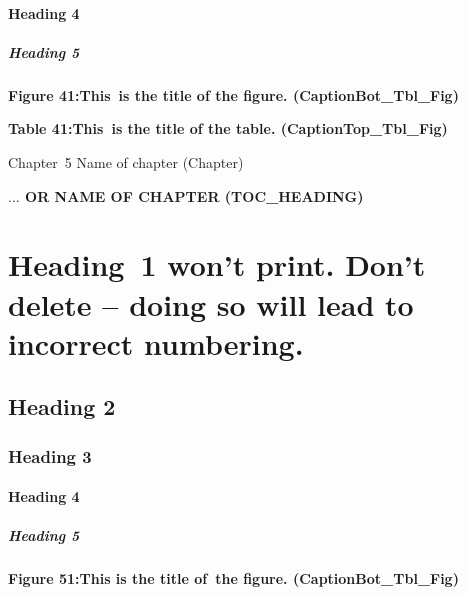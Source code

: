 \documentclass[12pt]{report}
\begin{document}
\paragraph*{Heading 4}
\subparagraph*{Heading 5}
\begin{FlushLeft}
\textbf{Figure 41:\tab This\ is the title of the figure.  (CaptionBot\_Tbl\_Fig)}
\end{FlushLeft}\par

\begin{FlushLeft}
\textbf{Table 41:\tab This\ is the title of the table.  (CaptionTop\_Tbl\_Fig)}
\end{FlushLeft}\par




\newpage

\vspace{\baselineskip}Chapter\ 5  Name of chapter (Chapter)\par

\begin{FlushLeft}
{\fontsize{14pt}{16.8pt}\selectfont \textbf{\uppercase{$ \ldots $ or Name of Chapter (TOC\_HEADING)}}\par}
\end{FlushLeft}\par

\section*{Heading\ 1 won’t print.  Don’t delete – doing so will lead to incorrect numbering.}
\subsection*{Heading 2}
\subsubsection*{Heading 3}
\paragraph*{Heading 4}
\subparagraph*{Heading 5}
\begin{FlushLeft}
\textbf{Figure 51:\tab This is the title of\ the figure.  (CaptionBot\_Tbl\_Fig)}
\end{FlushLeft}\par
\end{document}
